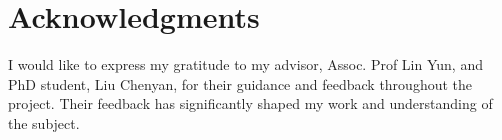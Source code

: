 \chapter*{Acknowledgments}

 I would like to express my gratitude to my advisor, Assoc. Prof Lin Yun, and PhD student, Liu Chenyan, for their guidance and feedback throughout the project. Their feedback has significantly shaped my work and understanding of the subject.